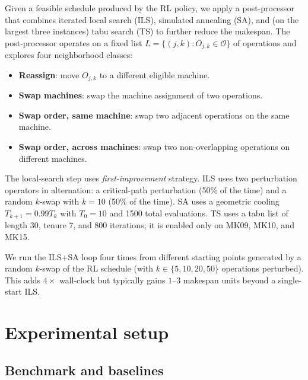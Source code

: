\documentclass[preprint,review,3p,times,twocolumn]{elsarticle}
\begin{document}
Given a feasible schedule produced by the RL policy, we
apply a post-processor that combines iterated local search
(ILS), simulated annealing (SA), and (on the largest three
instances) tabu search (TS) to further reduce the
makespan. The post-processor operates on a fixed list
$L = \{(j, k) : O_{j,k} \in \mathcal{O}\}$ of operations
and explores four neighborhood classes:
\begin{itemize}
  \item[$N_1$] \textbf{Reassign}: move $O_{j,k}$ to a
              different eligible machine.
  \item[$N_2$] \textbf{Swap machines}: swap the machine
              assignment of two operations.
  \item[$N_3$] \textbf{Swap order, same machine}: swap two
              adjacent operations on the same machine.
  \item[$N_4$] \textbf{Swap order, across machines}: swap
              two non-overlapping operations on different
              machines.
\end{itemize}

The local-search step uses \emph{first-improvement} strategy.
ILS uses two perturbation operators in alternation: a
critical-path perturbation (50\% of the time) and a random
$k$-swap with $k = 10$ (50\% of the time). SA uses a
geometric cooling $T_{k+1} = 0.99 T_k$ with $T_0 = 10$ and
1500 total evaluations. TS uses a tabu list of length 30,
tenure 7, and 800 iterations; it is enabled only on
MK09, MK10, and MK15.

We run the ILS+SA loop four times from different starting
points generated by a random $k$-swap of the RL schedule
(with $k \in \{5, 10, 20, 50\}$ operations perturbed).
This adds $4\times$ wall-clock but typically gains
$1\text{--}3$ makespan units beyond a single-start ILS.

\section{Experimental setup}
\label{sec:exp}

\subsection{Benchmark and baselines}
\end{document}
